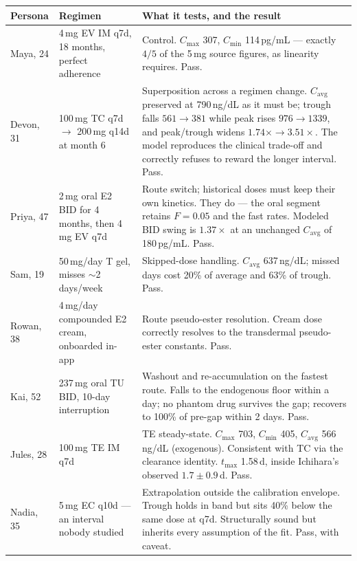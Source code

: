 \documentclass[11pt,a4paper]{article}
\newcommand{\good}[1]{\textcolor{ok}{#1}}
\begin{document}
\begin{longtable}{@{}p{2.6cm}p{4.5cm}p{7.4cm}@{}}
\toprule
\textbf{Persona} & \textbf{Regimen} & \textbf{What it tests, and the result} \\
\midrule
\endhead
Maya, 24 & 4\,mg EV IM q7d, 18 months, perfect adherence
 & Control. $C_{\max}$ 307, $C_{\min}$ 114\,pg/mL --- exactly $4/5$ of
   the 5\,mg source figures, as linearity requires. \good{Pass.} \\[0.4em]
Devon, 31 & 100\,mg TC q7d $\to$ 200\,mg q14d at month 6
 & Superposition across a regimen change. $C_{\mathrm{avg}}$ preserved
   at 790\,ng/dL as it must be; trough falls $561 \to 381$ while peak
   rises $976 \to 1339$, and peak/trough widens $1.74\times \to
   3.51\times$. The model reproduces the clinical trade-off and
   correctly refuses to reward the longer interval. \good{Pass.} \\[0.4em]
Priya, 47 & 2\,mg oral E2 BID for 4 months, then 4\,mg EV q7d
 & Route switch; historical doses must keep their own kinetics. They
   do --- the oral segment retains $F = 0.05$ and the fast rates.
   Modeled BID swing is $1.37\times$ at an unchanged $C_{\mathrm{avg}}$
   of 180\,pg/mL. \good{Pass.} \\[0.4em]
Sam, 19 & 50\,mg/day T gel, misses $\sim$2 days/week
 & Skipped-dose handling. $C_{\mathrm{avg}}$ 637\,ng/dL; missed days
   cost 20\% of average and 63\% of trough. \good{Pass.} \\[0.4em]
Rowan, 38 & 4\,mg/day compounded E2 cream, onboarded in-app
 & Route pseudo-ester resolution. Cream dose correctly resolves to the
   transdermal pseudo-ester constants. \good{Pass.} \\[0.4em]
Kai, 52 & 237\,mg oral TU BID, 10-day interruption
 & Washout and re-accumulation on the fastest route. Falls to the
   endogenous floor within a day; no phantom drug survives the gap;
   recovers to 100\% of pre-gap within 2 days. \good{Pass.} \\[0.4em]
Jules, 28 & 100\,mg TE IM q7d
 & TE steady-state. $C_{\max}$ 703, $C_{\min}$ 405, $C_{\mathrm{avg}}$
   566\,ng/dL (exogenous). Consistent with TC via the clearance
   identity. $t_{\max}$ 1.58\,d, inside Ichihara's observed $1.7 \pm
   0.9$\,d. \good{Pass.} \\[0.4em]
Nadia, 35 & 5\,mg EC q10d --- an interval nobody studied
 & Extrapolation outside the calibration envelope. Trough holds in
   band but sits 40\% below the same dose at q7d. Structurally sound
   but inherits every assumption of the fit. \good{Pass, with caveat.} \\
\bottomrule
\end{longtable}
\end{document}
